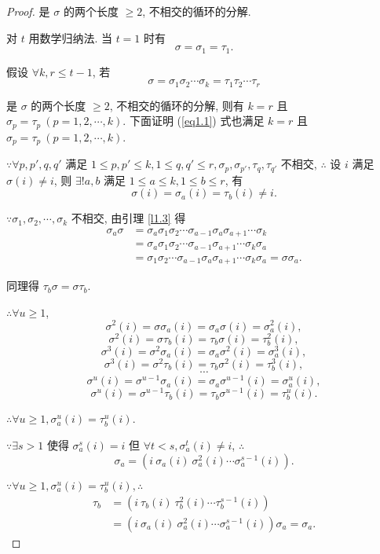 \documentclass{ctexart}
\begin{document}
\begin{proof}
    是 $\sigma$ 的两个长度 $\geq2$, 不相交的循环的分解.

    对 $t$ 用数学归纳法. 当 $t=1$ 时有
    \[\sigma=\sigma_1=\tau_1.\]

    假设 $\forall k,r\leq t-1$, 若
    \[\sigma=\sigma_1\sigma_2\cdots\sigma_k=\tau_1\tau_2\cdots\tau_r\]

    是 $\sigma$ 的两个长度 $\geq2$, 不相交的循环的分解, 则有 $k=r$ 且 $\sigma_p=\tau_p\ (p=1,2,\cdots,k)$. 下面证明 (\ref{eq1.1}) 式也满足 $k=r$ 且 $\sigma_p=\tau_p\ (p=1,2,\cdots,k)$.

    $\because\forall p,p',q,q'$ 满足 $1\leq p,p'\leq k,1\leq q,q'\leq r,\sigma_p,\sigma_{p'},\tau_q,\tau_{q'}$ 不相交, $\therefore$ 设 $i$ 满足 $\sigma(i)\neq i$, 则 $\exists!a,b$ 满足 $1\leq a\leq k,1\leq b\leq r$, 有
    \[\sigma(i)=\sigma_a(i)=\tau_b(i)\neq i.\]

    $\because\sigma_1,\sigma_2,\cdots,\sigma_k$ 不相交, 由引理 \ref{l1.3} 得
    \begin{align*}
        \sigma_{a}\sigma & =\sigma_{a}\sigma_1\sigma_2\cdots\sigma_{a-1}\sigma_{a}\sigma_{a+1}\cdots\sigma_k \\
        & =\sigma_{a}\sigma_1\sigma_2\cdots\sigma_{a-1}\sigma_{a+1}\cdots\sigma_k\sigma_{a} \\
        & =\sigma_1\sigma_2\cdots\sigma_{a-1}\sigma_{a}\sigma_{a+1}\cdots\sigma_k\sigma_{a}=\sigma\sigma_{a}.
    \end{align*}

    同理得 $\tau_b\sigma=\sigma\tau_b$.

    $\therefore\forall u\geq1$,
    \[\sigma^2(i)=\sigma\sigma_a(i)=\sigma_a\sigma(i)=\sigma_a^2(i),\]
    \[\sigma^2(i)=\sigma\tau_b(i)=\tau_b\sigma(i)=\tau_b^2(i),\]
    \[\sigma^3(i)=\sigma^2\sigma_a(i)=\sigma_a\sigma^2(i)=\sigma_a^3(i),\]
    \[\sigma^3(i)=\sigma^2\tau_b(i)=\tau_b\sigma^2(i)=\tau_b^3(i),\]
    \[\cdots\]
    \[\sigma^u(i)=\sigma^{u-1}\sigma_a(i)=\sigma_a\sigma^{u-1}(i)=\sigma_a^u(i),\]
    \[\sigma^u(i)=\sigma^{u-1}\tau_b(i)=\tau_b\sigma^{u-1}(i)=\tau_b^u(i).\]

    $\therefore\forall u\geq1,\sigma_a^u(i)=\tau_b^u(i)$.

    $\because\exists s>1$ 使得 $\sigma_a^s(i)=i$ 但 $\forall t<s,\sigma_a^t(i)\neq i$, $\therefore$
    \[\sigma_a=(i\ \sigma_a(i)\ \sigma_a^2(i)\cdots\sigma_a^{s-1}(i)).\]

    $\because\forall u\geq1,\sigma_a^u(i)=\tau_b^u(i),\therefore$
    \begin{align*}
        \tau_b & =(i\ \tau_b(i)\ \tau_b^2(i)\cdots\tau_b^{s-1}(i)) \\
        & =(i\ \sigma_a(i)\ \sigma_a^2(i)\cdots\sigma_a^{s-1}(i))\sigma_a=\sigma_a.
    \end{align*}


\end{proof}
\end{document}
